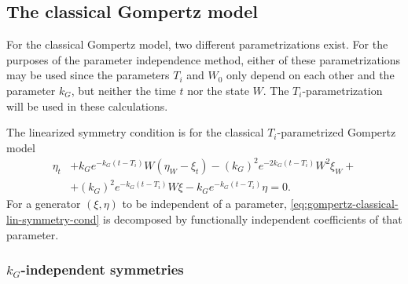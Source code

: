 \subsection{The classical Gompertz model}

For the classical Gompertz model, two different parametrizations exist.
For the purposes of the parameter independence method, either of these parametrizations may be used since the parameters \(T_i\) and \(W_0\) only depend on each other and the parameter \(k_G\), but neither the time \(t\) nor the state \(W\).
The \(T_i\)-parametrization will be used in these calculations.

The linearized symmetry condition  is for the classical \(T_i\)-parametrized Gompertz model
\begin{equation}\label{eq:gompertz-classical-lin-symmetry-cond}
  \begin{split}
    \eta_t &+ k_G e^{-k_G (t - T_i)} W\left(\eta_W - \xi_t\right) - (k_G)^2 e^{-2k_G (t - T_i)} W^2 \xi_W +\\ &+ (k_G)^2 e^{-k_G (t - T_i)} W \xi - k_G e^{-k_G (t - T_i)} \eta = 0.
  \end{split}
\end{equation}
For a generator \(\left(\xi, \eta\right)\) to be independent of a parameter, \cref{eq:gompertz-classical-lin-symmetry-cond} is decomposed by functionally independent coefficients of that parameter.

\subsubsection{\texorpdfstring{\(k_G\)-independent symmetries}{Growth rate-independent symmetries}}

